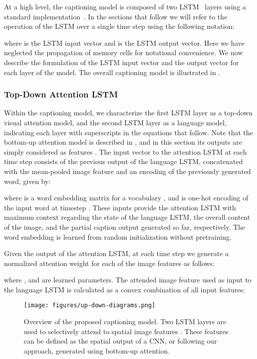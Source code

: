 \documentclass[10pt,twocolumn,letterpaper]{article}
\begin{document}
At a high level, the captioning model is composed of two LSTM~\cite{Hochreiter1997} layers using a standard implementation~\cite{Donahue2015}. In the sections that follow we will refer to the operation of the LSTM over a single time step using the following notation:

\noindent
where  is the LSTM input vector and  is the LSTM output vector. Here we have neglected the propagation of memory cells for notational convenience. We now describe the formulation of the LSTM input vector  and the output vector  for each layer of the model. The overall captioning model is illustrated in . 

\subsubsection{Top-Down Attention LSTM}

Within the captioning model, we characterize the first LSTM layer as a top-down visual attention model, and the second LSTM layer as a language model, indicating each layer with superscripts in the equations that follow. Note that the bottom-up attention model is described in , and in this section its outputs are simply considered as features . The input vector to the attention LSTM at each time step consists of the previous output of the language LSTM, concatenated with the mean-pooled image feature  and an encoding of the previously generated word, given by:

\noindent where  is a word embedding matrix for a vocabulary , and  is one-hot encoding of the input word at timestep . These inputs provide the attention LSTM with maximum context regarding the state of the language LSTM, the overall content of the image, and the partial caption output generated so far, respectively. The word embedding is learned from random initialization without pretraining.

Given the output  of the attention LSTM, at each time step  we generate a normalized attention weight  for each of the  image features  as follows:

\noindent
where ,  and  are learned parameters. The attended image feature used as input to the language LSTM is calculated as a convex combination of all input features:

\begin{figure}[t]
	\begin{center}
		\texttt{[image: figures/up-down-diagrams.png]}
	\end{center}
	\caption{Overview of the proposed captioning model. Two LSTM layers are used to selectively attend to spatial image features . These features can be defined as the spatial output of a CNN, or following our approach, generated using bottom-up attention.}
	\label{fig:captioner}
\end{figure}
\end{document}
